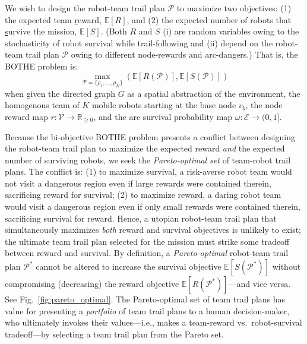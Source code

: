 \documentclass[11pt, oneside]{article}
\begin{document}
We wish to design the robot-team trail plan $\mathcal{P}$ to maximize two objectives: 
(1) the expected team \underline{r}eward, $\mathbb{E}[R]$, and (2) the expected number of robots that \underline{s}urvive the mission, $\mathbb{E}[S]$. (Both $R$ and $S$ (i) are random variables owing to the stochasticity of robot survival while trail-following and (ii) depend on the robot-team trail plan $\mathcal{P}$ owing to different node-rewards and arc-dangers.)
That is, the BOTHE problem is:
\begin{equation}
	\max_{\mathcal{P}=\{\rho_1, ..., \rho_K\}} \left( \mathbb{E}[R(\mathcal{P})], \mathbb{E}[S(\mathcal{P})] \right)
	\label{eq:the_two_objs}
\end{equation}
when given the directed graph $G$ as a spatial abstraction of the environment, 
the homogenous team of $K$ mobile robots starting at the base node $v_b$,
the node reward map $r: \mathcal{V} \rightarrow \mathbb{R}_{\geq 0}$, and the arc survival probability map $\omega : \mathcal{E} \rightarrow (0, 1]$.

Because the bi-objective BOTHE problem presents a conflict between designing the robot-team trail plan to maximize the expected reward \emph{and} the expected number of surviving robots, we seek the \emph{Pareto-optimal set} \cite{pardalos2017non,branke2008multiobjective} of team-robot trail plans. 
The conflict is: 
(1) to maximize survival, a risk-averse robot team would not visit a dangerous region even if large rewards were contained therein, sacrificing reward for survival; 
(2) to maximize reward, a daring robot team would visit a dangerous region even if only small rewards were contained therein, sacrificing survival for reward. 
Hence, a utopian robot-team trail plan that simultaneously maximizes \emph{both} reward and survival objectives is unlikely to exist; the ultimate team trail plan selected for the mission must strike some tradeoff between reward and survival.
By definition, a \emph{Pareto-optimal} \cite{pardalos2017non,branke2008multiobjective} robot-team trail plan $\mathcal{P}^*$ cannot be altered to increase the survival objective $\mathbb{E}[S(\mathcal{P}^*)]$ without compromising (decreasing) the reward objective $\mathbb{E}[R(\mathcal{P}^*)]$---and vice versa. See Fig.~\ref{fig:pareto_optimal}.
The Pareto-optimal set of team trail plans has value for presenting a \emph{portfolio} of team trail plans to a human decision-maker, who ultimately invokes their values---i.e., makes a team-reward vs.\  robot-survival tradeoff---by selecting a team trail plan from the Pareto set.
\end{document}
